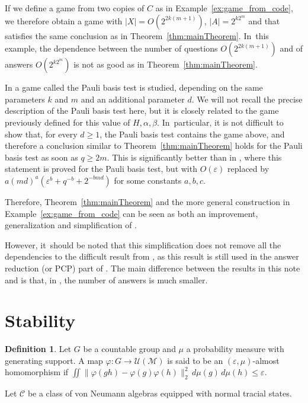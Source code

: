 \documentclass[10pt]{amsart}
\theoremstyle{plain}
\theoremstyle{definition}
\newtheorem{definition}[theorem]{Definition}
\newcommand{\cM}{\mathcal{M}}
\newcommand{\vn}{\mathcal{C}}
\newcommand{\cU}{\mathcal{U}}
\begin{document}
If we define a game from two copies of $C$ as in Example~\ref{ex:game_from_code}, we therefore obtain a game with $|X| = O(2^{2k(m+1)})$, $|A| = 2^{k2^m}$ and that satisfies the same conclusion as in Theorem~\ref{thm:mainTheorem}. In~this example, the dependence between the number of questions $O(2^{2k(m+1)})$ and of answers $O(2^{k 2^m})$ is not as good as in Theorem~\ref{thm:mainTheorem}.

In \cite[\S 7.3]{MIPRE} a game called the Pauli basis test is
studied, depending on the same parameters $k$ and $m$ and an
additional parameter $d$. We will not recall the precise description
of the Pauli basis test here, but it is closely related to the game
previously defined for this value of $H,\alpha,\beta$. In~particular,
it is not difficult to show that, for every $d\geq 1$, the Pauli basis
test contains the game above, and therefore a conclusion similar to
Theorem~\ref{thm:mainTheorem} holds for the Pauli basis test as soon
as $q \geq 2m$. This is significantly better than in \cite[Th.\,7.14]{MIPRE}, where this statement is proved for the Pauli basis
test, but with $O(\varepsilon)$ replaced by $a(md)^a(\varepsilon^b +
q^{-b}+2^{-bmd})$ for some constants $a,b,c$.

Therefore, Theorem~\ref{thm:mainTheorem} and the more general construction in Example~\ref{ex:game_from_code} can be seen as both an improvement, generalization and simplification of \cite[Th.\,7.14]{MIPRE}.

However, it~should be noted that this simplification does not remove
all the dependencies to the difficult result from
\cite{MR4399717,MR4518868}, as this result is still used in the answer
reduction (or PCP) part of \cite{MIPRE}. The main difference between
the results in this note and \cite{MR4518868} is that, in
\cite{MR4518868}, the number of answers is much smaller.

\section{Stability}\label{sec:stability}

\begin{definition} Let $G$ be a countable group and $\mu$ a probability measure with generating support. A map $\varphi:G\to \cU(\cM)$ is said to be an $(\varepsilon,\mu)$-almost homomorphism if $\iint \| \varphi(gh) - \varphi(g) \varphi(h)\|_2^2\,d\mu(g) \,d\mu(h) \leq \varepsilon$.
\end{definition}
Let $\vn$ be a class of von Neumann algebras equipped with normal tracial states.
\end{document}
